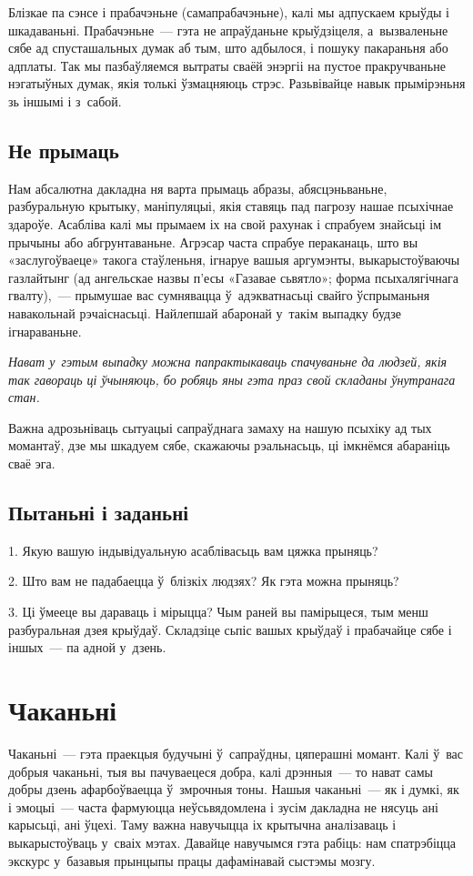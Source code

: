 Блізкае па сэнсе і прабачэньне (самапрабачэньне), калі мы адпускаем крыўды і шкадаваньні. Прабачэньне~--- гэта не апраўданьне крыўдзіцеля, а~вызваленьне сябе ад спусташальных думак аб тым, што адбылося, і пошуку пакараньня або адплаты. Так мы пазбаўляемся вытраты сваёй энэргіі на пустое пракручваньне нэгатыўных думак, якія толькі ўзмацняюць стрэс. Разьвівайце навык прымірэньня зь іншымі і з~сабой.

\subsection*{Не прымаць}

Нам абсалютна дакладна ня варта прымаць абразы, абясцэньваньне, разбуральную крытыку, маніпуляцыі, якія ставяць пад пагрозу нашае псыхічнае здароўе. Асабліва калі мы прымаем іх на свой рахунак і спрабуем знайсьці ім прычыны або абгрунтаваньне. Агрэсар часта спрабуе пераканаць, што вы «заслугоўваеце» такога стаўленьня, ігнаруе вашыя аргумэнты, выкарыстоўваючы газлайтынг (ад ангельскае назвы п'есы «Газавае сьвятло»; форма псыхалягічнага гвалту),~--- прымушае вас сумнявацца ў~адэкватнасьці свайго ўспрыманьня навакольнай рэчаіснасьці. Найлепшай абаронай у~такім выпадку будзе ігнараваньне.

\emph{Нават у~гэтым выпадку можна папрактыкаваць спачуваньне да людзей, якія так гавораць ці ўчыняюць, бо робяць яны гэта праз свой складаны ўнутранага стан.}

Важна адрозьніваць сытуацыі сапраўднага замаху на нашую псыхіку ад тых момантаў, дзе мы шкадуем сябе, скажаючы рэальнасьць, ці імкнёмся абараніць сваё эга.

\subsection*{Пытаньні і заданьні}

1. Якую вашую індывідуальную асаблівасьць вам цяжка прыняць?

2. Што вам не падабаецца ў~блізкіх людзях? Як гэта можна прыняць?

3. Ці ўмееце вы дараваць і мірыцца? Чым раней вы памірыцеся, тым менш разбуральная дзея крыўдаў. Складзіце сьпіс вашых крыўдаў і прабачайце сябе і іншых~--- па адной у~дзень.


\section{Чаканьні}

Чаканьні~--- гэта праекцыя будучыні ў~сапраўдны, цяперашні момант. Калі ў~вас добрыя чаканьні, тыя вы пачуваецеся добра, калі дрэнныя~--- то нават самы добры дзень афарбоўваецца ў~змрочныя тоны. Нашыя чаканьні~--- як і думкі, як і эмоцыі~--- часта фармуюцца неўсьвядомлена і зусім дакладна не нясуць ані карысьці, ані ўцехі. Таму важна навучыцца іх крытычна аналізаваць і выкарыстоўваць у~сваіх мэтах. Давайце навучымся гэта рабіць: нам спатрэбіцца экскурс у~базавыя прынцыпы працы дафамінавай сыстэмы мозгу.

